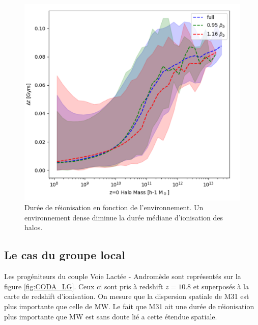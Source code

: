 \begin{figure}
		\centering
		\includegraphics[width=.95\linewidth]{img/05/median_dt_envir.pdf}
        \caption[Durée de réionisation et environnement]{Durée de réionisation en fonction de l'environnement.
        Un environnement dense diminue la durée médiane d'ionisation des halos.
		\label{fig:CODA_environnement}}
\end{figure}


\subsection{Le cas du groupe local}


Les progéniteurs du couple Voie Lactée - Andromède sont représentés sur la figure \ref{fig:CODA_LG}.
Ceux ci sont pris à redshift $z=10.8$ et superposés à la carte de redshift d'ionisation.
On mesure que la dispersion spatiale de M31 est plus importante que celle de MW.
Le fait que M31 ait une durée de réionisation plus importante que MW est sans doute lié a cette étendue spatiale.


